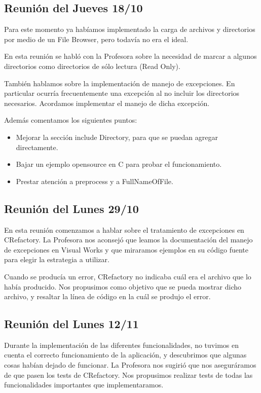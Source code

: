 \documentclass[a4paper,oneside,12pt]{article}
\begin{document}
\subsection{Reuni\'on del Jueves 18/10}
Para este momento ya hab\'iamos implementado la carga de archivos y directorios por medio de un File Browser, pero todav\'ia no era el ideal.

En esta reuni\'on se habl\'o con la Profesora sobre la necesidad de marcar a algunos directorios como directorios de s\'olo lectura (Read Only).

Tambi\'en hablamos sobre la implementaci\'on de manejo de excepciones. En particular ocurr\'ia frecuentemente una excepci\'on al no incluir los directorios necesarios. Acordamos implementar el manejo de dicha excepci\'on.


Adem\'as comentamos los siguientes puntos:
\begin{itemize}
 \item Mejorar la secci\'on include Directory, para que se puedan agregar directamente.
 \item Bajar un ejemplo opensource en C para probar el funcionamiento.
 \item Prestar atenci\'on a preprocess y a FullNameOfFile.
\end{itemize}

\subsection{Reuni\'on del Lunes 29/10}
En esta reuni\'on comenzamos a hablar sobre el tratamiento de excepciones en CRefactory. La Profesora nos aconsej\'o que leamos la documentaci\'on del manejo de excepciones en Visual Works y que miraramos ejemplos en su c\'odigo fuente para elegir la estrategia a utilizar.

Cuando se produc\'ia un error, CRefactory no indicaba cu\'al era el archivo que lo hab\'ia producido. Nos propusimos como objetivo que se pueda mostrar dicho archivo, y resaltar la l\'inea de c\'odigo en la cu\'al se produjo el error.

\subsection{Reuni\'on del Lunes 12/11}
Durante la implementaci\'on de las diferentes funcionalidades, no tuvimos en cuenta el correcto funcionamiento de la aplicaci\'on, y descubrimos que algunas cosas hab\'ian dejado de funcionar. La Profesora nos sugiri\'o que nos asegur\'aramos de que pasen los tests de CRefactory. Nos propusimos realizar tests de todas las funcionalidades importantes que implementaramos.
\end{document}
